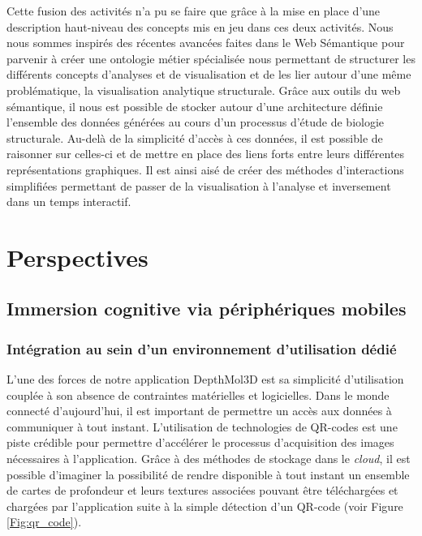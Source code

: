 Cette fusion des activités n'a pu se faire que grâce à la mise en place d'une description haut-niveau des concepts mis en jeu dans ces deux activités. Nous nous sommes inspirés des récentes avancées faites dans le Web Sémantique pour parvenir à créer une ontologie métier spécialisée nous permettant de structurer les différents concepts d'analyses et de visualisation et de les lier autour d'une même problématique, la visualisation analytique structurale. 
Grâce aux outils du web sémantique, il nous est possible de stocker autour d'une architecture définie l'ensemble des données générées au cours d'un processus d'étude de biologie structurale. Au-delà de la simplicité d'accès à ces données, il est possible de raisonner sur celles-ci et de mettre en place des liens forts entre leurs différentes représentations graphiques. Il est ainsi aisé de créer des méthodes d'interactions simplifiées permettant de passer de la visualisation à l'analyse et inversement dans un temps interactif.


\section*{Perspectives}

\subsection{Immersion cognitive via périphériques mobiles}

\subsubsection*{Intégration au sein d'un environnement d'utilisation dédié}

L'une des forces de notre application DepthMol3D est sa simplicité d'utilisation couplée à son absence de contraintes matérielles et logicielles. Dans le monde connecté d'aujourd'hui, il est important de permettre un accès aux données à communiquer à tout instant. L'utilisation de technologies de QR-codes est une piste crédible pour permettre d'accélérer le processus d'acquisition des images nécessaires à l'application. Grâce à des méthodes de stockage dans le \textit{cloud}, il est possible d'imaginer la possibilité de rendre disponible à tout instant un ensemble de cartes de profondeur et leurs textures associées pouvant être téléchargées et chargées par l'application suite à la simple détection d'un QR-code (voir Figure \ref{Fig:qr_code}).

